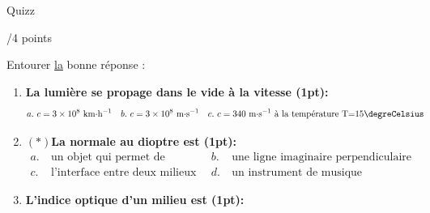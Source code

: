 \begin{doc}{Quizz \begin{Large}
    /4 points
\end{Large}}
Entourer \underline{la} bonne réponse :
\begin{enumerate}
    \item \textbf{La lumière se propage dans le vide à la vitesse (1pt):}
        \begin{align*}
            a.& ~\text{$c=3\times10^8$~km$\cdot$h$^{-1}$} & b.& ~\text{$c=3\times10^8$~m$\cdot$s$^{-1}$} & c.& ~\text{$c=340$~m$\cdot$s$^{-1}$ à la température T=15$\degreCelsius$}
        \end{align*}
    \item \textbf{$(*)$La normale au dioptre est (1pt):}
        \begin{align*}
            a.& ~\text{un objet qui permet de disperser la lumière} & b.&~\text{une ligne imaginaire perpendiculaire à l'interface} \\
            c.& ~\text{l'interface entre deux milieux différents} & d.&~\text{un instrument de musique}
        \end{align*}
    \item \textbf{L'indice optique d'un milieu est (1pt):}
        \begin{align*}

\end{align*}
\end{enumerate}
\end{doc}
